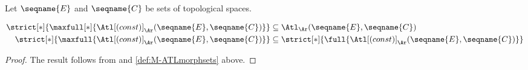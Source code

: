 \documentclass{article}
\begin{document}
\begin{corollary}
\label{cor:M-ATLmorphsets}
Let $\seqname{E}$ and $\seqname{C}$ be sets of topological spaces.

\begin{align*}
  \strict[*]
    {
      \maxfull[*]
        {
          \Atl[(const)]_\Ar
            (\seqname{E}, \seqname{C})
        }
    }
  & \subseteq
  \Atl_\Ar
    (\seqname{E}, \seqname{C})
\\
  \strict[*]
    {
      \maxfull
        {
          \Atl[(const)]_\Ar
            (\seqname{E}, \seqname{C})
        }
    }
  & \subseteq
  \strict[*]
    {
      \full
        {
          \Atl[(const)]_\Ar
            (\seqname{E}, \seqname{C})
        }
    }
\end{align*}

\begin{proof}
The result follows from
{
  \showlabelsinline
}
and \cref{def:M-ATLmorphsets} above.
\end{proof}
\end{corollary}
\end{document}
